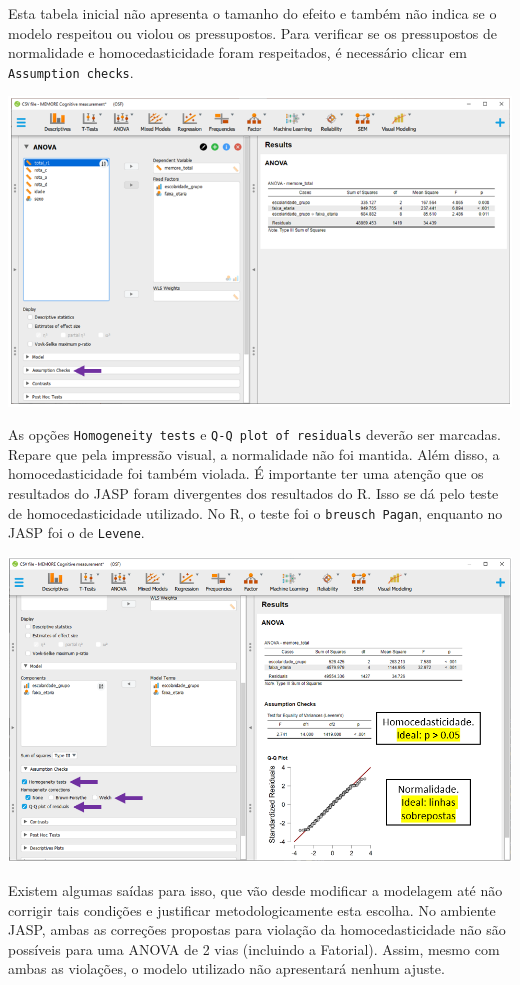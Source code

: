 \documentclass[
]{book}
\begin{document}
Esta tabela inicial não apresenta o tamanho do efeito e também não indica se o modelo respeitou ou violou os pressupostos. Para verificar se os pressupostos de normalidade e homocedasticidade foram respeitados, é necessário clicar em \texttt{Assumption\ checks}.

\includegraphics{./img/cap_anova_fatorial_pressupostos.png}

As opções \texttt{Homogeneity\ tests} e \texttt{Q-Q\ plot\ of\ residuals} deverão ser marcadas. Repare que pela impressão visual, a normalidade não foi mantida. Além disso, a homocedasticidade foi também violada. É importante ter uma atenção que os resultados do JASP foram divergentes dos resultados do R. Isso se dá pelo teste de homocedasticidade utilizado. No R, o teste foi o \texttt{breusch\ Pagan}, enquanto no JASP foi o de \texttt{Levene}.

\includegraphics{./img/cap_anova_two_way_pressupostos2.png}

Existem algumas saídas para isso, que vão desde modificar a modelagem até não corrigir tais condições e justificar metodologicamente esta escolha. No ambiente JASP, ambas as correções propostas para violação da homocedasticidade não são possíveis para uma ANOVA de 2 vias (incluindo a Fatorial). Assim, mesmo com ambas as violações, o modelo utilizado não apresentará nenhum ajuste.
\end{document}
